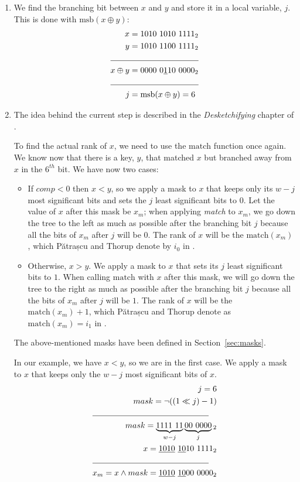 \begin{enumerate}
    \item
    We find the branching bit between $x$ and $y$ and store it in a local variable, $j$. This is done with $\text{msb}(x \oplus y)$:
    \begin{align*}
        x &= 1010\ 1010\ 1111_2\\
        y &= 1010\ 1100\ 1111_2\\
        \cline{1-2}
        x \oplus y &= 0000\ 0\underline{1}10\ 0000_2\\
        \cline{1-2}
        j &= \text{msb}(x \oplus y) = 6
    \end{align*}
    
    \item
    The idea behind the current step is described in the \textit{Desketchifying} chapter of \cite{erikdemainelec12}.
    
    To find the actual rank of $x$, we need to use the $\text{match}$ function once again. We know now that there is a key, $y$, that matched $x$ but branched away from $x$ in the $6^{th}$ bit.
    We have now two cases:
    \begin{itemize}
        \item
        If $comp < 0$ then $x < y$, so we apply a mask to $x$ that keeps only its $w-j$ most significant bits and sets the $j$ least significant bits to $0$. Let the value of $x$ after this mask be $x_m$; when applying \textit{match} to $x_m$, we go down the tree to the left as much as possible after the branching bit $j$ because all the bits of $x_m$ after $j$ will be $0$. The rank of $x$ will be the $\text{match}(x_m)$, which Pătrașcu and Thorup denote by $i_0$ in \cite{patrascu2014dynamic}.
        
        \item
        Otherwise, $x > y$. We apply a mask to $x$ that sets its $j$ least significant bits to $1$. When calling $\text{match}$ with $x$ after this mask, we will go down the tree to the right as much as possible after the branching bit $j$ because all the bits of $x_m$ after $j$ will be $1$. The rank of $x$ will be the $\text{match}(x_m) + 1$, which Pătrașcu and Thorup denote as $\text{match}(x_m) = i_1$ in \cite{patrascu2014dynamic}.
    \end{itemize}
    The above-mentioned masks have been defined in Section~\ref{sec:masks}.
    
    In our example, we have $x < y$, so we are in the first case. We apply a mask to $x$ that keeps only the $w-j$ most significant bits of $x$. 
    \begin{align*}
        j = 6\\
        mask = \neg((1 \ll j) - 1)\\
        \cline{1-2}
        mask = \underbrace{1111\ 11}_{w-j}\underbrace{00\ 0000}_j{}_2\\
        x = \underline{1010}\ \underline{10}10\ 1111_2\\
        \cline{1-2}
        x_m = x \wedge mask = \underline{1010}\ \underline{10}00\ 0000_2
    \end{align*}


\end{enumerate}
